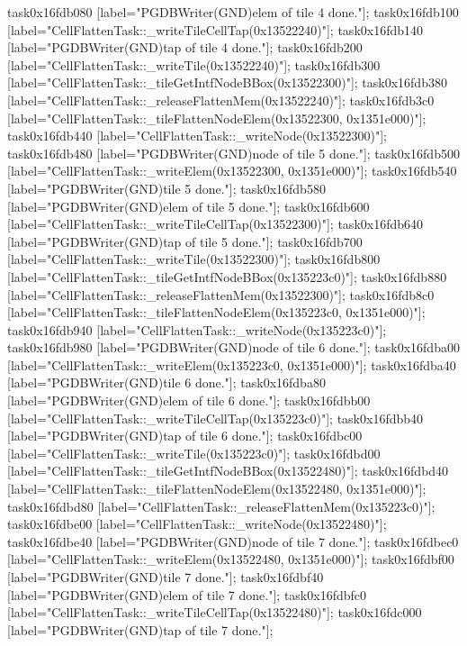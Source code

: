 {	task0x16fdb080 [label="PGDBWriter(GND)\nCell elem of tile 4 done."];
	task0x16fdb100 [label="CellFlattenTask::_writeTileCellTap(0x13522240)"];
	task0x16fdb140 [label="PGDBWriter(GND)\nCell tap of tile 4 done."];
	task0x16fdb200 [label="CellFlattenTask::_writeTile(0x13522240)"];
	task0x16fdb300 [label="CellFlattenTask::_tileGetIntfNodeBBox(0x13522300)"];
	task0x16fdb380 [label="CellFlattenTask::_releaseFlattenMem(0x13522240)"];
	task0x16fdb3c0 [label="CellFlattenTask::_tileFlattenNodeElem(0x13522300, 0x1351e000)"];
	task0x16fdb440 [label="CellFlattenTask::_writeNode(0x13522300)"];
	task0x16fdb480 [label="PGDBWriter(GND)\nCell node of tile 5 done."];
	task0x16fdb500 [label="CellFlattenTask::_writeElem(0x13522300, 0x1351e000)"];
	task0x16fdb540 [label="PGDBWriter(GND)\nCell tile 5 done."];
	task0x16fdb580 [label="PGDBWriter(GND)\nCell elem of tile 5 done."];
	task0x16fdb600 [label="CellFlattenTask::_writeTileCellTap(0x13522300)"];
	task0x16fdb640 [label="PGDBWriter(GND)\nCell tap of tile 5 done."];
	task0x16fdb700 [label="CellFlattenTask::_writeTile(0x13522300)"];
	task0x16fdb800 [label="CellFlattenTask::_tileGetIntfNodeBBox(0x135223c0)"];
	task0x16fdb880 [label="CellFlattenTask::_releaseFlattenMem(0x13522300)"];
	task0x16fdb8c0 [label="CellFlattenTask::_tileFlattenNodeElem(0x135223c0, 0x1351e000)"];
	task0x16fdb940 [label="CellFlattenTask::_writeNode(0x135223c0)"];
	task0x16fdb980 [label="PGDBWriter(GND)\nCell node of tile 6 done."];
	task0x16fdba00 [label="CellFlattenTask::_writeElem(0x135223c0, 0x1351e000)"];
	task0x16fdba40 [label="PGDBWriter(GND)\nCell tile 6 done."];
	task0x16fdba80 [label="PGDBWriter(GND)\nCell elem of tile 6 done."];
	task0x16fdbb00 [label="CellFlattenTask::_writeTileCellTap(0x135223c0)"];
	task0x16fdbb40 [label="PGDBWriter(GND)\nCell tap of tile 6 done."];
	task0x16fdbc00 [label="CellFlattenTask::_writeTile(0x135223c0)"];
	task0x16fdbd00 [label="CellFlattenTask::_tileGetIntfNodeBBox(0x13522480)"];
	task0x16fdbd40 [label="CellFlattenTask::_tileFlattenNodeElem(0x13522480, 0x1351e000)"];
	task0x16fdbd80 [label="CellFlattenTask::_releaseFlattenMem(0x135223c0)"];
	task0x16fdbe00 [label="CellFlattenTask::_writeNode(0x13522480)"];
	task0x16fdbe40 [label="PGDBWriter(GND)\nCell node of tile 7 done."];
	task0x16fdbec0 [label="CellFlattenTask::_writeElem(0x13522480, 0x1351e000)"];
	task0x16fdbf00 [label="PGDBWriter(GND)\nCell tile 7 done."];
	task0x16fdbf40 [label="PGDBWriter(GND)\nCell elem of tile 7 done."];
	task0x16fdbfc0 [label="CellFlattenTask::_writeTileCellTap(0x13522480)"];
	task0x16fdc000 [label="PGDBWriter(GND)\nCell tap of tile 7 done."];
}
